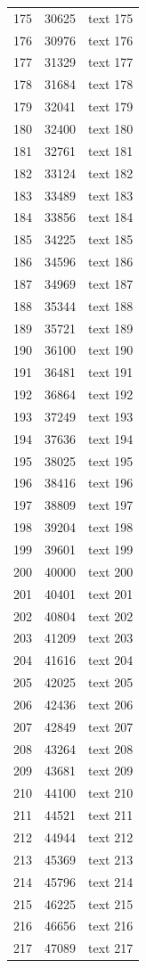 \documentclass[10pt]{article}
\begin{document}
\begin{longtable}{rrl}
175&30625&text 175\\
176&30976&text 176\\
177&31329&text 177\\
178&31684&text 178\\
179&32041&text 179\\
180&32400&text 180\\
181&32761&text 181\\
182&33124&text 182\\
183&33489&text 183\\
184&33856&text 184\\
185&34225&text 185\\
186&34596&text 186\\
187&34969&text 187\\
188&35344&text 188\\
189&35721&text 189\\
190&36100&text 190\\
191&36481&text 191\\
192&36864&text 192\\
193&37249&text 193\\
194&37636&text 194\\
195&38025&text 195\\
196&38416&text 196\\
197&38809&text 197\\
198&39204&text 198\\
199&39601&text 199\\
200&40000&text 200\\
201&40401&text 201\\
202&40804&text 202\\
203&41209&text 203\\
204&41616&text 204\\
205&42025&text 205\\
206&42436&text 206\\
207&42849&text 207\\
208&43264&text 208\\
209&43681&text 209\\
210&44100&text 210\\
211&44521&text 211\\
212&44944&text 212\\
213&45369&text 213\\
214&45796&text 214\\
215&46225&text 215\\
216&46656&text 216\\
217&47089&text 217\\

\end{longtable}
\end{document}
